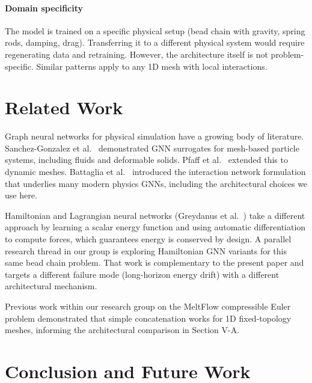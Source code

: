 \documentclass[conference]{IEEEtran}
\begin{document}
\paragraph{Domain specificity} The model is trained on a specific physical setup (bead chain with gravity, spring rods, damping, drag). Transferring it to a different physical system would require regenerating data and retraining. However, the architecture itself is not problem-specific. Similar patterns apply to any 1D mesh with local interactions.

\section{Related Work}

Graph neural networks for physical simulation have a growing body of literature. Sanchez-Gonzalez et al.~\cite{sanchez2020learning} demonstrated GNN surrogates for mesh-based particle systems, including fluids and deformable solids. Pfaff et al.~\cite{pfaff2020learning} extended this to dynamic meshes. Battaglia et al.~\cite{battaglia2016interaction} introduced the interaction network formulation that underlies many modern physics GNNs, including the architectural choices we use here.

Hamiltonian and Lagrangian neural networks (Greydanus et al.~\cite{greydanus2019hamiltonian}) take a different approach by learning a scalar energy function and using automatic differentiation to compute forces, which guarantees energy is conserved by design. A parallel research thread in our group is exploring Hamiltonian GNN variants for this same bead chain problem. That work is complementary to the present paper and targets a different failure mode (long-horizon energy drift) with a different architectural mechanism.

Previous work within our research group on the MeltFlow compressible Euler problem demonstrated that simple concatenation works for 1D fixed-topology meshes, informing the architectural comparison in Section V-A.

\section{Conclusion and Future Work}
\end{document}
